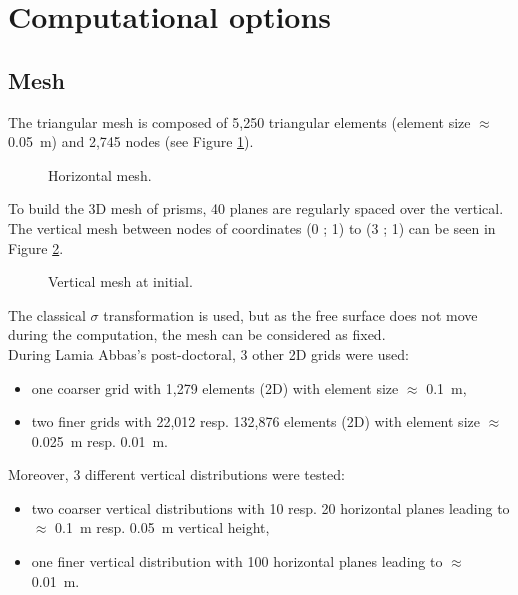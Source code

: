 %
\section{Computational options}
%
\subsection{Mesh}
%
The triangular mesh is composed of 5,250 triangular elements (element size
$\approx$ 0.05~m) and 2,745 nodes (see Figure \ref{fig:bump_static:mesh}).

\begin{figure}[H]
 \centering
  \caption{Horizontal mesh.}\label{fig:bump_static:mesh}
\end{figure}

To build the 3D mesh of prisms, 40 planes are regularly spaced over the vertical.
The vertical mesh between nodes of coordinates (0 ; 1) to (3 ; 1) can be seen
in Figure \ref{fig:bump_static:mesh:section}.

\begin{figure}[H]
 \centering
  \caption{Vertical mesh at initial.}\label{fig:bump_static:mesh:section}
\end{figure}

The classical $\sigma$ transformation is used, but as the free surface does not
move during the computation, the mesh can be considered as fixed.\\

During Lamia Abbas's post-doctoral, 3 other 2D grids were used:
\begin{itemize}
\item one coarser grid with 1,279 elements (2D) with element size $\approx$ 0.1~m,
\item two finer grids with 22,012 resp. 132,876 elements (2D) with element
size $\approx$ 0.025~m resp. 0.01~m.
\end{itemize}

Moreover, 3 different vertical distributions were tested:
\begin{itemize}
\item two coarser vertical distributions with 10 resp. 20 horizontal planes
  leading to $\approx$ 0.1~m resp. 0.05~m vertical height,
\item one finer vertical distribution with 100 horizontal planes leading to
  $\approx$ 0.01~m.
\end{itemize}

